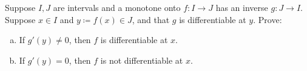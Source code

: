 \begin{exercise}
Suppose $I,J$ are intervals and a monotone onto $f \colon I \to J$ has an inverse $g \colon J \to I$.
Suppose $x \in I$ and $y \coloneqq f(x) \in J$, and that $g$ is differentiable at
$y$.  Prove:
\begin{enumerate}[a)]
\item
If $g'(y) \not= 0$, then $f$ is differentiable at $x$.
\item
If $g'(y) = 0$, then $f$ is not differentiable at $x$.
\end{enumerate}
\end{exercise}
